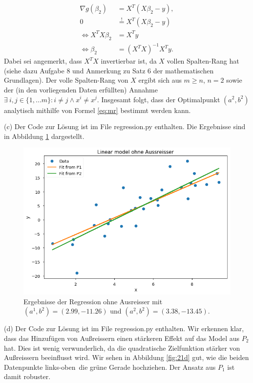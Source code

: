 \documentclass[ngerman, a4paper,12pt]{article}
\begin{document}
\begin{equation}
\label{eq:mr}
	\begin{split}
		\nabla g(\beta_2) &= X^T(X\beta_2 -y),\\
		0 &\overset{!}{=} X^T(X\beta_2 -y) \\
		\iff X^TX \beta_2 &= X^Ty \\
		\iff \beta_2	&=	(X^TX)^{-1}X^Ty.
	\end{split}
\end{equation}
Dabei sei angemerkt, dass $X^TX$ invertierbar ist, da $X$ vollen Spalten-Rang hat (siehe dazu Aufgabe 8 und Anmerkung zu Satz 6 der mathematischen Grundlagen). Der volle Spalten-Rang von $X$ ergibt sich aus $m \geq n$, $n=2$ sowie der (in den vorliegenden Daten erfüllten) Annahme $\exists \ i,j \in \{1, ...m \}: i \neq j \wedge x^i \neq x^j$. Insgesamt folgt, dass der Optimalpunkt $(a^2, b^2)$ analytisch mithilfe von Formel \eqref{eq:mr} bestimmt werden kann.\par
(c) Der Code zur Lösung ist im File regression.py enthalten. Die Ergebnisse sind in Abbildung \ref{fig:21c} dargestellt.
\begin{figure}[h]
	\centering
	\includegraphics[width=0.8\columnwidth]{21c.png}
	\caption{\label{fig:21c} Ergebnisse der Regression ohne Ausreisser mit $(a^1, b^2) = (2.99, -11.26)$ und $(a^2, b^2) = (3.38, -13.45)$.}
\end{figure}
\par
(d) Der Code zur Lösung ist im File regression.py enthalten. Wir erkennen klar, dass das Hinzufügen von Außreissern einen stärkeren Effekt auf das Model aus $P_2$ hat. Dies ist wenig verwunderlich, da die quadratische Zielfunktion stärker von Außreissern beeinflusst wird. Wir sehen in Abbildung \ref{fig:21d} gut, wie die beiden Datenpunkte \glqq links-oben\grqq \ die grüne Gerade \glqq hochziehen\grqq. Der Ansatz aus $P_1$ ist damit robuster. \par
\end{document}
